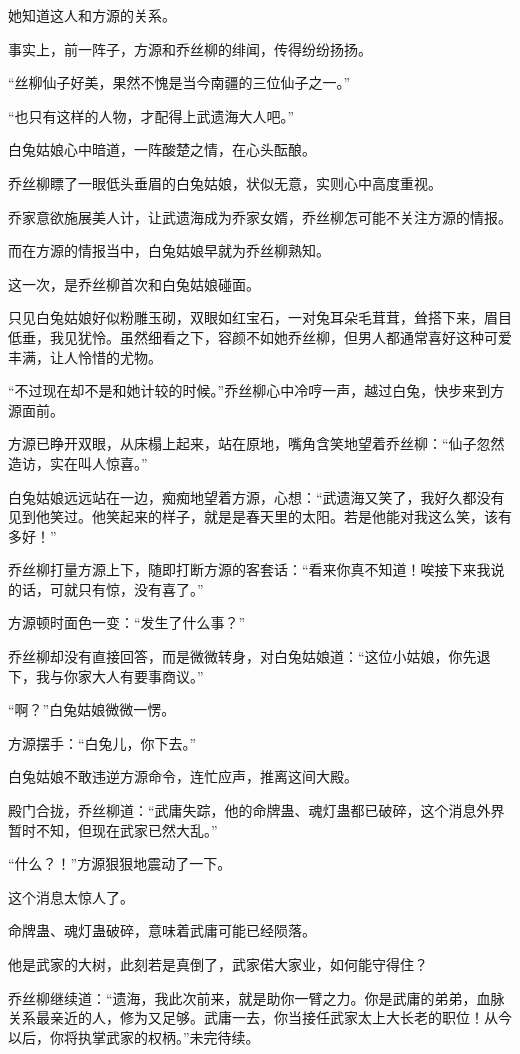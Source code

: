 \begin{this_body}
她知道这人和方源的关系。

事实上，前一阵子，方源和乔丝柳的绯闻，传得纷纷扬扬。

“丝柳仙子好美，果然不愧是当今南疆的三位仙子之一。”

“也只有这样的人物，才配得上武遗海大人吧。”

白兔姑娘心中暗道，一阵酸楚之情，在心头酝酿。

乔丝柳瞟了一眼低头垂眉的白兔姑娘，状似无意，实则心中高度重视。

乔家意欲施展美人计，让武遗海成为乔家女婿，乔丝柳怎可能不关注方源的情报。

而在方源的情报当中，白兔姑娘早就为乔丝柳熟知。

这一次，是乔丝柳首次和白兔姑娘碰面。

只见白兔姑娘好似粉雕玉砌，双眼如红宝石，一对兔耳朵毛茸茸，耸搭下来，眉目低垂，我见犹怜。虽然细看之下，容颜不如她乔丝柳，但男人都通常喜好这种可爱丰满，让人怜惜的尤物。

“不过现在却不是和她计较的时候。”乔丝柳心中冷哼一声，越过白兔，快步来到方源面前。

方源已睁开双眼，从床榻上起来，站在原地，嘴角含笑地望着乔丝柳：“仙子忽然造访，实在叫人惊喜。”

白兔姑娘远远站在一边，痴痴地望着方源，心想：“武遗海又笑了，我好久都没有见到他笑过。他笑起来的样子，就是是春天里的太阳。若是他能对我这么笑，该有多好！”

乔丝柳打量方源上下，随即打断方源的客套话：“看来你真不知道！唉接下来我说的话，可就只有惊，没有喜了。”

方源顿时面色一变：“发生了什么事？”

乔丝柳却没有直接回答，而是微微转身，对白兔姑娘道：“这位小姑娘，你先退下，我与你家大人有要事商议。”

“啊？”白兔姑娘微微一愣。

方源摆手：“白兔儿，你下去。”

白兔姑娘不敢违逆方源命令，连忙应声，推离这间大殿。

殿门合拢，乔丝柳道：“武庸失踪，他的命牌蛊、魂灯蛊都已破碎，这个消息外界暂时不知，但现在武家已然大乱。”

“什么？！”方源狠狠地震动了一下。

这个消息太惊人了。

命牌蛊、魂灯蛊破碎，意味着武庸可能已经陨落。

他是武家的大树，此刻若是真倒了，武家偌大家业，如何能守得住？

乔丝柳继续道：“遗海，我此次前来，就是助你一臂之力。你是武庸的弟弟，血脉关系最亲近的人，修为又足够。武庸一去，你当接任武家太上大长老的职位！从今以后，你将执掌武家的权柄。”未完待续。

\end{this_body}

